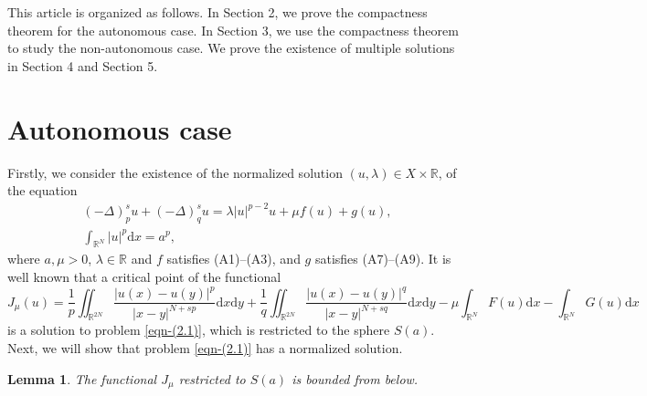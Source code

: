 \documentclass[10pt,a4paper]{amsart}
\numberwithin{equation}{section}
\newtheorem{lemma}[theorem]{Lemma}
\begin{document}
This article is organized as follows.
In Section 2, we prove the compactness theorem for the autonomous case.
In Section 3, we use the compactness theorem to study the non-autonomous case.
We prove the existence of multiple solutions in Section 4 and Section 5.

\section{Autonomous case}

Firstly, we consider the existence of the normalized solution
$(u,\lambda)\in X \times\mathbb {R}$, of the equation
\begin{equation}\label{eqn-(2.1)}
\begin{gathered}
(-\Delta)_{p}^{s} u+(-\Delta)_q^{s} u=\lambda |u|^{p-2}u+\mu f(u)+g(u),\\
\int_{\mathbb {R}^{N}}|u|^p \mathrm{d}x=a^p,
\end{gathered}
\end{equation}
where $a,\mu>0$, $\lambda\in\mathbb{R}$ and $f$ satisfies (A1)--(A3), and  $g$ satisfies
(A7)--(A9). It is well known that a critical point of the functional
$$J
_\mu(u)=\frac{1}{p}\iint_{\mathbb{R}^{2N}}\frac{|u(x)-u(y)|^p}{|x-y|^{N+sp}}
\mathrm{d}x\mathrm{d}y+\frac{1}{q}\iint_{\mathbb{R}^{2N}}\frac{|u(x)-u(y)|^q}{|x-y|^{N+sq}}\mathrm{d}x\mathrm{d}y-\mu\int_{\mathbb{R}^N}F(u)\mathrm{d}x-\int_{\mathbb{R}^{N}}G(u)\mathrm{d}x
$$
is a solution to problem \eqref{eqn-(2.1)},
which is restricted to the sphere $S(a)$.
Next, we will show that problem \eqref{eqn-(2.1)} has a normalized solution.

\begin{lemma}\label{lem:2.1}
The functional $J_\mu$ restricted to $S(a)$ is bounded from below.
\end{lemma}
\end{document}
